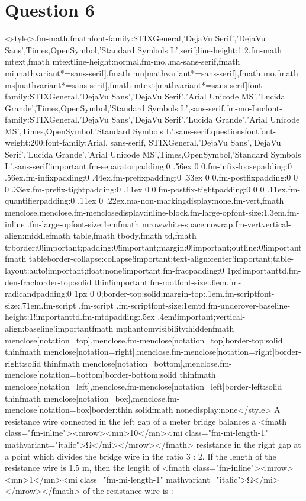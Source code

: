 \documentclass{article}
\begin{document}
\section*{Question 6}
<style>.fm-math,fmath{font-family:STIXGeneral,'DejaVu Serif','DejaVu Sans',Times,OpenSymbol,'Standard Symbols L',serif;line-height:1.2}.fm-math mtext,fmath mtext{line-height:normal}.fm-mo,.ma-sans-serif,fmath mi[mathvariant*=sans-serif],fmath mn[mathvariant*=sans-serif],fmath mo,fmath ms[mathvariant*=sans-serif],fmath mtext[mathvariant*=sans-serif]{font-family:STIXGeneral,'DejaVu Sans','DejaVu Serif','Arial Unicode MS','Lucida Grande',Times,OpenSymbol,'Standard Symbols L',sans-serif}.fm-mo-Luc{font-family:STIXGeneral,'DejaVu Sans','DejaVu Serif','Lucida Grande','Arial Unicode MS',Times,OpenSymbol,'Standard Symbols L',sans-serif}.questionsfont{font-weight:200;font-family:Arial, sans-serif, STIXGeneral,'DejaVu Sans','DejaVu Serif','Lucida Grande','Arial Unicode MS',Times,OpenSymbol,'Standard Symbols L',sans-serif!important}.fm-separator{padding:0 .56ex 0 0}.fm-infix-loose{padding:0 .56ex}.fm-infix{padding:0 .44ex}.fm-prefix{padding:0 .33ex 0 0}.fm-postfix{padding:0 0 0 .33ex}.fm-prefix-tight{padding:0 .11ex 0 0}.fm-postfix-tight{padding:0 0 0 .11ex}.fm-quantifier{padding:0 .11ex 0 .22ex}.ma-non-marking{display:none}.fm-vert,fmath menclose,menclose.fm-menclose{display:inline-block}.fm-large-op{font-size:1.3em}.fm-inline .fm-large-op{font-size:1em}fmath mrow{white-space:nowrap}.fm-vert{vertical-align:middle}fmath table,fmath tbody,fmath td,fmath tr{border:0!important;padding:0!important;margin:0!important;outline:0!important}fmath table{border-collapse:collapse!important;text-align:center!important;table-layout:auto!important;float:none!important}.fm-frac{padding:0 1px!important}td.fm-den-frac{border-top:solid thin!important}.fm-root{font-size:.6em}.fm-radicand{padding:0 1px 0 0;border-top:solid;margin-top:.1em}.fm-script{font-size:.71em}.fm-script .fm-script .fm-script{font-size:1em}td.fm-underover-base{line-height:1!important}td.fm-mtd{padding:.5ex .4em!important;vertical-align:baseline!important}fmath mphantom{visibility:hidden}fmath menclose[notation=top],menclose.fm-menclose[notation=top]{border-top:solid thin}fmath menclose[notation=right],menclose.fm-menclose[notation=right]{border-right:solid thin}fmath menclose[notation=bottom],menclose.fm-menclose[notation=bottom]{border-bottom:solid thin}fmath menclose[notation=left],menclose.fm-menclose[notation=left]{border-left:solid thin}fmath menclose[notation=box],menclose.fm-menclose[notation=box]{border:thin solid}fmath none{display:none}</style> A resistance wire connected in the left gap of a meter bridge balances a <fmath class="fm-inline"><mrow><mn>10</mn><mi class="fm-mi-length-1" mathvariant="italic">Ω</mi></mrow></fmath> resistance in the right gap at a point which divides the bridge wire in the ratio 3 : 2. If the length of the resistance wire is 1.5 m, then the length of <fmath class="fm-inline"><mrow><mn>1</mn><mi class="fm-mi-length-1" mathvariant="italic">Ω</mi></mrow></fmath> of the resistance wire is :  
\end{document}
